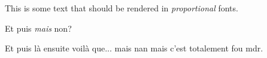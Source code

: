 
  This is some text that should be rendered in \textit{proportional} fonts.


Et puis \textit{mais} non?



  Et puis là ensuite voilà que... mais nan mais c'est totalement fou mdr.

